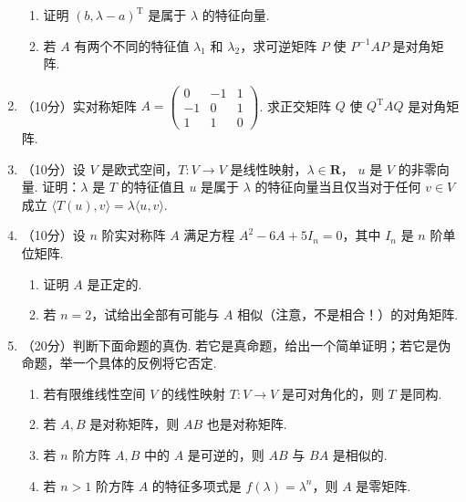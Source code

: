 \begin{enumerate}
\begin{enumerate}
        \item 证明 $(b,\lambda-a)^\mathrm{T}$ 是属于 $\lambda$ 的特征向量.

        \item 若 $A$ 有两个不同的特征值 $\lambda_1$ 和 $\lambda_2$，求可逆矩阵 $P$ 使 $P^{-1}AP$ 是对角矩阵.
    \end{enumerate}

    \item （10分）实对称矩阵 $A=\begin{pmatrix}0 & -1 & 1 \\ -1 & 0 & 1 \\ 1 & 1 & 0\end{pmatrix}$.  求正交矩阵 $Q$ 使 $Q^\mathrm{T}AQ$ 是对角矩阵.

    \item （10分）设 $V$ 是欧式空间，$T\colon V\to V$ 是线性映射，$\lambda \in \mathbf{R}$， $u$ 是 $V$ 的非零向量. 证明：$\lambda$ 是 $T$ 的特征值且 $u$ 是属于 $\lambda$ 的特征向量当且仅当对于任何 $v\in V$ 成立 $\langle T(u),v\rangle = \lambda\langle u,v\rangle$.

    \item （10分）设 $n$ 阶实对称阵 $A$ 满足方程 $A^2-6A+5I_n=0$，其中 $I_n$ 是 $n$ 阶单位矩阵.
    \begin{enumerate}
        \item 证明 $A$ 是正定的.

        \item 若 $n=2$，试给出全部有可能与 $A$ 相似（注意，不是相合！）的对角矩阵.
    \end{enumerate}

    \item （20分）判断下面命题的真伪. 若它是真命题，给出一个简单证明；若它是伪命题，举一个具体的反例将它否定.
    \begin{enumerate}
        \item 若有限维线性空间 $V$ 的线性映射 $T\colon V \to V$ 是可对角化的，则 $T$ 是同构.

        \item 若 $A,B$ 是对称矩阵，则 $AB$ 也是对称矩阵.

        \item 若 $n$ 阶方阵 $A,B$ 中的 $A$ 是可逆的，则 $AB$ 与 $BA$ 是相似的.

        \item 若 $n>1$ 阶方阵 $A$ 的特征多项式是 $f(\lambda)=\lambda^n$，则 $A$ 是零矩阵.
    \end{enumerate}
\end{enumerate}

\clearpage
